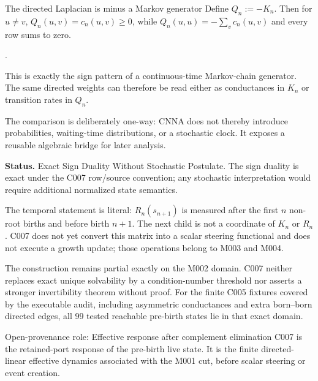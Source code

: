 \begin{cnnaInfoBox}{The directed Laplacian is minus a Markov generator}
\label{box:c007-markov-generator-infobox}
Define $Q_n:=-K_n$.  Then for $u\ne v$, $Q_n(u,v)=c_n(u,v)\ge0$, while $Q_n(u,u)=-\sum_v c_n(u,v)$ and every row sums to zero.

\cite[Ch.~2, continuous-time Markov chains]{Norris1997MarkovChains}.

This is exactly the sign pattern of a continuous-time Markov-chain generator.  The same directed weights can therefore be read either as conductances in $K_n$ or transition rates in $Q_n$.

The comparison is deliberately one-way: CNNA does not thereby introduce probabilities, waiting-time distributions, or a stochastic clock.  It exposes a reusable algebraic bridge for later analysis.

\textbf{Status.} Exact Sign Duality Without Stochastic Postulate. The sign duality is exact under the C007 row/source convention; any stochastic interpretation would require additional normalized state semantics.
\end{cnnaInfoBox}


The temporal statement is literal: $R_n(s_{n+1})$ is measured after the first
$n$ non-root births and before birth $n+1$.  The next child is not a coordinate
of $K_n$ or $R_n$.  C007 does not yet convert this matrix into a scalar steering
functional and does not execute a growth update; those operations belong to
M003 and M004.

The construction remains partial exactly on the M002 domain.  C007 neither
replaces exact unique solvability by a condition-number threshold nor asserts a
stronger invertibility theorem without proof.  For the finite C005 fixtures
covered by the executable audit, including asymmetric conductances and extra
born--born directed edges, all 99 tested reachable pre-birth states lie in that
exact domain.

\begin{cnnaInfoBox}{Open-provenance role: Effective response after complement elimination}
C007 is the retained-port response of the pre-birth live state.  It is the finite directed-linear effective dynamics associated with the M001 cut, before scalar steering or event creation.
\end{cnnaInfoBox}

